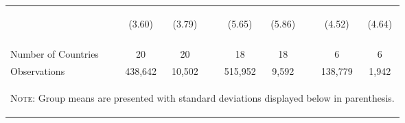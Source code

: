 \documentclass{article}[11pt,subeqn]
\begin{document}
\begin{spacing}{1.5}
\begin{table}[ht]
\begin{center}
\begin{tabular}{lccp{5mm}ccp{5mm}cc}
\begin{footnotesize}\end{footnotesize}	& \begin{footnotesize} (3.60)\end{footnotesize} & \begin{footnotesize} (3.79)\end{footnotesize} & \begin{footnotesize} 	\end{footnotesize} & \begin{footnotesize} (5.65)\end{footnotesize} & \begin{footnotesize} (5.86)\end{footnotesize} & \begin{footnotesize} 	\end{footnotesize} & \begin{footnotesize} (4.52)\end{footnotesize} & \begin{footnotesize} (4.64)\end{footnotesize}	\\
\\ \midrule																
Number of Countries & 20 & 20 & & 18 & 18 & & 6 & 6 \\
Observations & 438,642 & 10,502 & & 515,952 & 9,592 & & 138,779 & 1,942 \\ 
\bottomrule																
\multicolumn{9}{p{12cm}}{\setstretch{0.9}\begin{footnotesize}\textsc{Note:} Group means are presented with standard deviations displayed below in parenthesis.\end{footnotesize}}\\

\end{tabular}
\end{center}
\end{table}


\end{spacing}
\end{document}
